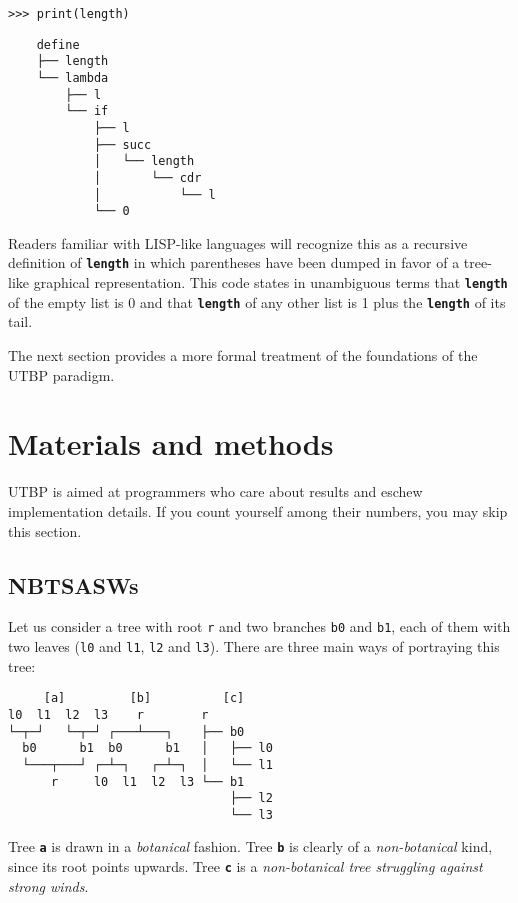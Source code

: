\documentclass[12pt,twocolumn]{article}
\begin{document}
\begin{verbatim}
>>> print(length)
\end{verbatim}
\begin{verbatim}
    define
    ├── length
    └── lambda
        ├── l
        └── if
            ├── l
            ├── succ
            │   └── length
            │       └── cdr
            │           └── l
            └── 0
\end{verbatim}

Readers familiar with LISP-like languages will recognize this as a recursive definition of \texttt{\textbf{length}} in which parentheses have been dumped in favor of a tree-like graphical representation. This code states in unambiguous terms that \texttt{\textbf{length}} of the empty list is 0 and that \texttt{\textbf{length}} of any other list is 1 plus the \texttt{\textbf{length}} of its tail.

The next section provides a more formal treatment of the foundations of the UTBP paradigm.

\section{Materials and methods}\label{section_methods}
UTBP is aimed at programmers who care about results and eschew implementation details. If you count yourself among their numbers, you may skip this section.

\subsection{NBTSASWs}
Let us consider a tree with root \texttt{r} and two branches \texttt{b0} and \texttt{b1}, each of them with two leaves (\texttt{l0} and \texttt{l1}, \texttt{l2} and \texttt{l3}). There are three main ways of portraying this tree:
\begin{verbatim}
     [a]         [b]          [c]
l0  l1  l2  l3    r        r
└─┬─┘   └─┬─┘ ┌───┴───┐    ├── b0
  b0      b1  b0      b1   │   ├── l0
  └───┬───┘ ┌─┴─┐   ┌─┴─┐  │   └── l1
      r     l0  l1  l2  l3 └── b1
                               ├── l2
                               └── l3
\end{verbatim}

Tree \texttt{\textbf{a}} is drawn in a \emph{botanical} fashion. Tree \texttt{\textbf{b}} is clearly of a \emph{non-botanical} kind, since its root points upwards. Tree \texttt{\textbf{c}} is a \emph{non-botanical tree struggling against strong winds}.
\end{document}
